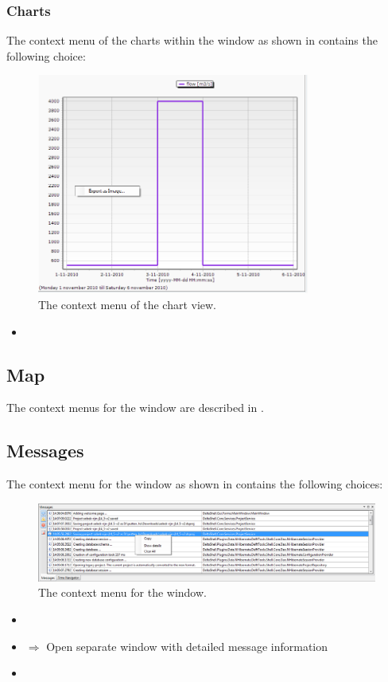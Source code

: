 \subsubsection{Charts}
\label{subsubsec:charts}
The context menu of the charts within the  window as shown in  contains the following choice: 
%
\begin{figure} [H]
	\centering
		\includegraphics[width=0.8\textwidth]{figures/chapter_overview/context_menu_chart.png}
	\caption{The context menu of the chart view.}
	\label{fig:contextmenuchart}
\end{figure}
\begin{itemize}
	\item {}
\end{itemize}
\subsection{Map}
\label{subsec:map}
The context menus for the  window are described in .
%
\subsection{Messages}
\label{subsec:messages2}
The context menu for the  window as shown in  contains the following choices: 
%
\begin{figure} [H]
	\centering
		\includegraphics[width=\textwidth]{figures/chapter_overview/context_menu_messages.png}
	\caption{The context menu for the  window.}
	\label{fig:contextmenumessages}
\end{figure}
\begin{itemize}
	\item {}
	\item {} $\Rightarrow$ Open separate window with detailed message information
	\item {}
\end{itemize}

